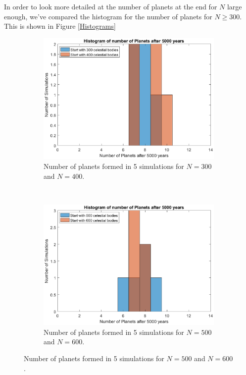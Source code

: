 In order to look more detailed at the number of planets at the end for $N$ large enough, we've compared the histogram for the number of planets for $N\geq 300$. This is shown in Figure \ref{Histograms}
\vspace{-5pt}
\begin{figure}[H]
	\centering
	\begin{subfigure}{0.45\textwidth}
	\includegraphics[width=\textwidth]{AP300400.eps}
	\caption{Number of planets formed in 5 simulations for $N=300$ and $N=400$.}
	\end{subfigure}
	~
	\begin{subfigure}{0.45\textwidth}
	\includegraphics[width=\textwidth]{AP500600.eps}
	\caption{Number of planets formed in 5 simulations for $N=500$ and $N=600$.}
	\end{subfigure}
	

\end{figure}
